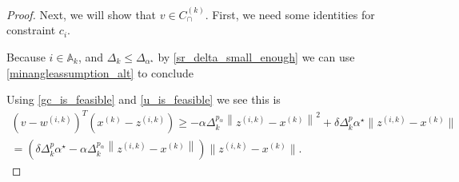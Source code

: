 \documentclass{article}
\theoremstyle{case}
\numberwithin{theorem}{subsection}
\newcommand{\activeconstraintsk}{{\mathbb A_{k}}}
\newcommand{\capcones}{{C^{(k)}_{\cap}}}
\newcommand{\chik}{{\chi^{(k)}}}
\newcommand{\dk}{\Delta_k}
\newcommand{\gk}{{\nabla m_f^{(k)}\left(\xk\right)}}
\newcommand{\maxgrad}{{M_{\nabla}}}
\newcommand{\maxhessian}{{M_{\nabla^2}}}
\newcommand{\mfk}{{{m}_f}^{(k)}}
\newcommand{\minanglealpha}{{ \alpha^{\star} }}
\newcommand{\minangledelta}{{\Delta_{\alpha^{\star}}}}
\newcommand{\tr}{{ B_{\infty}\left(\xk, \dk\right) }}
\newcommand{\wik}{{w^{(i, k)}}}
\newcommand{\xk}{x^{(k)}}
\newcommand{\zik}{{z^{(i, k)}}}
\begin{document}
\begin{proof}


Next, we will show that $v \in \capcones$.
First, we need some identities for constraint $c_i$.

Because $i \in \activeconstraintsk$, and $\dk\le\minangledelta$ by \cref{sr_delta_small_enough} we can use \cref{minangleassumption_alt} to conclude






Using \cref{gc_is_feasible} and \cref{u_is_feasible} we see this is
\begin{align}
\left(v - \wik \right)^T\left(\xk - \zik \right)  \ge - \alpha \dk ^{p_{\alpha}} \left\|\zik - \xk\right\|^2
+ \delta\dk^{p} \minanglealpha \|\zik - \xk\| \nonumber \\
= \left(
\delta\dk^{p} \minanglealpha
- \alpha \dk ^{p_{\alpha}} \left\|\zik - \xk\right\|
\right)\|\zik - \xk\|. \label{sr_what_to_bound}
\end{align}


\end{proof}
\end{document}
